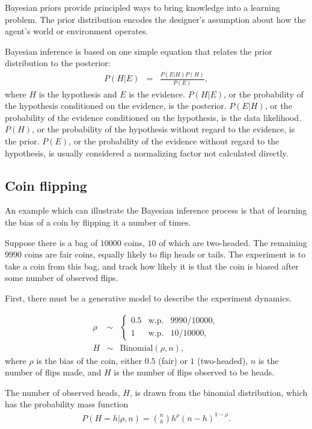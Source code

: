 Bayesian priors provide principled ways to bring knowledge into a learning problem. The prior distribution encodes the designer's assumption about how the agent's world or environment operates.

Bayesian inference is based on one simple equation that relates the prior distribution to the posterior:
\begin{eqnarray}
\label{intro:eqn:bayes} P(H|E) &=& \frac{P(E|H)P(H)}{P(E)},
\end{eqnarray}
where $H$ is the hypothesis and $E$ is the evidence. $P(H|E)$, or the probability of the hypothesis conditioned on the evidence, is the posterior. $P(E|H)$, or the probability of the evidence conditioned on the hypothesis, is the data likelihood. $P(H)$, or the probability of the hypothesis without regard to the evidence, is the prior. $P(E)$, or the probability of the evidence without regard to the hypothesis, is usually considered a normalizing factor not calculated directly.

\subsection{Coin flipping}

An example which can illustrate the Bayesian inference process is that of learning the bias of a coin by flipping it a number of times.

Suppose there is a bag of $10000$ coins, $10$ of which are two-headed. The remaining $9990$ coins are fair coins, equally likely to flip heads or tails. The experiment is to take a coin from this bag, and track how likely it is that the coin is biased after some number of observed flips.

First, there must be a generative model to describe the experiment dynamics.

\begin{eqnarray}
\label{intro:eqn:coinbag}\rho &\sim&
\left\{\begin{array}{lll}
0.5 & \mbox{w.p.} & 9990/10000,\\
1 & \mbox{w.p.} & 10/10000,
\end{array}\right.\\
\label{}H &\sim& \mbox{Binomial}(\rho, n),
\end{eqnarray}
where $\rho$ is the bias of the coin, either $0.5$ (fair) or $1$ (two-headed), $n$ is the number of flips made, and $H$ is the number of flips observed to be heads.

The number of observed heads, $H$, is drawn from the binomial distribution, which has the probability mass function 
\begin{eqnarray}
\label{intro:eqn:binomial} P(H=h|\rho, n) = {n \choose h} h^\rho (n-h)^{1-\rho}.
\end{eqnarray}

